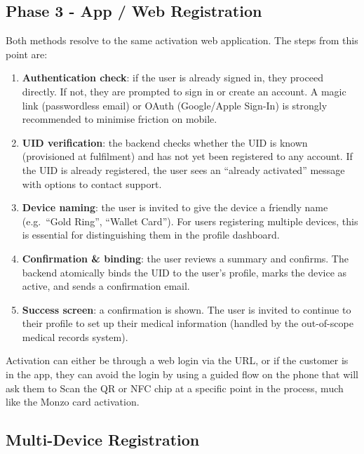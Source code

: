 \documentclass[
	a4paper, %
]{ChaosEngineReport}
\begin{document}
\subsection{Phase 3 - App / Web Registration}

Both methods resolve to the same activation web application. The steps from this point are:

\begin{enumerate}
  \item \textbf{Authentication check}: if the user is already signed in, they proceed directly. If not, they are prompted to sign in or create an account. A magic link (passwordless email) or OAuth (Google/Apple Sign-In) is strongly recommended to minimise friction on mobile.

  \item \textbf{UID verification}: the backend checks whether the UID is known (provisioned at fulfilment) and has not yet been registered to any account. If the UID is already registered, the user sees an ``already activated'' message with options to contact support.

  \item \textbf{Device naming}: the user is invited to give the device a friendly name (e.g.\ ``Gold Ring'', ``Wallet Card''). For users registering multiple devices, this is essential for distinguishing them in the profile dashboard.

  \item \textbf{Confirmation \& binding}: the user reviews a summary and confirms. The backend atomically binds the UID to the user's profile, marks the device as active, and sends a confirmation email.

  \item \textbf{Success screen}: a confirmation is shown. The user is invited to continue to their profile to set up their medical information (handled by the out-of-scope medical records system).
\end{enumerate}

Activation can either be through a web login via the URL, or if the customer is in the app, they can avoid the login by using a guided flow on the phone that will ask them to Scan the QR or NFC chip at a specific point in the process, much like the Monzo card activation.

\subsection{Multi-Device Registration}
\end{document}
